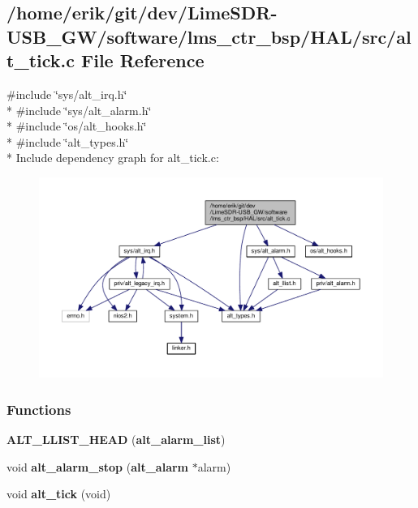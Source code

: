 \subsection{/home/erik/git/dev/\+Lime\+S\+D\+R-\/\+U\+S\+B\+\_\+\+G\+W/software/lms\+\_\+ctr\+\_\+bsp/\+H\+A\+L/src/alt\+\_\+tick.c File Reference}
\label{alt__tick_8c}
{\ttfamily \#include \char`\"{}sys/alt\+\_\+irq.\+h\char`\"{}}\\*
{\ttfamily \#include \char`\"{}sys/alt\+\_\+alarm.\+h\char`\"{}}\\*
{\ttfamily \#include \char`\"{}os/alt\+\_\+hooks.\+h\char`\"{}}\\*
{\ttfamily \#include \char`\"{}alt\+\_\+types.\+h\char`\"{}}\\*
Include dependency graph for alt\+\_\+tick.\+c\+:
\nopagebreak
\begin{figure}[H]
\begin{center}
\leavevmode
\includegraphics[width=350pt]{d2/ded/alt__tick_8c__incl}
\end{center}
\end{figure}
\subsubsection*{Functions}
\begin{DoxyCompactItemize}
\item 
{\bf A\+L\+T\+\_\+\+L\+L\+I\+S\+T\+\_\+\+H\+E\+AD} ({\bf alt\+\_\+alarm\+\_\+list})
\item 
void {\bf alt\+\_\+alarm\+\_\+stop} ({\bf alt\+\_\+alarm} $\ast$alarm)
\item 
void {\bf alt\+\_\+tick} (void)
\end{DoxyCompactItemize}
